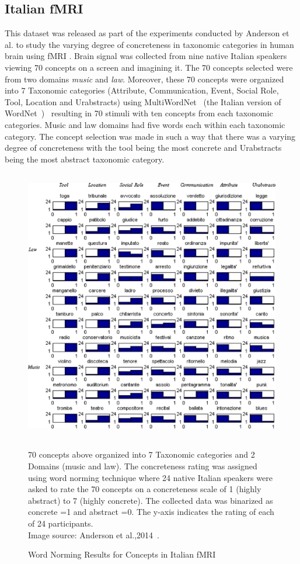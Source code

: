 \subsection{Italian fMRI}
This dataset was released as part of the experiments conducted by Anderson et al. to study the varying degree of concreteness in taxonomic categories in human brain using fMRI \cite{AndersonConcreteness}. Brain signal was collected from nine native Italian speakers viewing 70 concepts on a screen and imagining it. The 70 concepts selected were from two domains \textit{music} and \textit{law}. Moreover, these 70 concepts were organized into 7 Taxonomic categories (Attribute, Communication, Event, Social Role, Tool, Location and Urabstracts) using MultiWordNet~\cite{ItalianWordNet} (the Italian version of WordNet~\cite{wordnet})~ resulting in 70 stimuli with ten concepts from each taxonomic categories. Music and law domains had five words each within each taxonomic category. The concept selection was made in such a way that there was a varying degree of concreteness with the tool being the most concrete and Urabstracts being the most abstract taxonomic category. 

\begin{figure}[!t]
\centering
\includegraphics[width=12cm, height=12cm]{Figures/concreteness}
\caption{Word Norming Results for Concepts in Italian fMRI}
\label{ItalianFMRI}
70 concepts above organized into 7 Taxonomic categories and 2 Domains (music and law). The concreteness rating was assigned using word norming technique \cite{Barca2002WordNT} where 24 native Italian speakers were asked to rate the 70 concepts on a concreteness scale of 1 (highly abstract) to 7 (highly concrete). The collected data was binarized as concrete =1 and abstract =0. The y-axis indicates the rating of each of 24 participants.\\Image source: Anderson et al.,2014~\cite{AndersonConcreteness}.
\end{figure}

